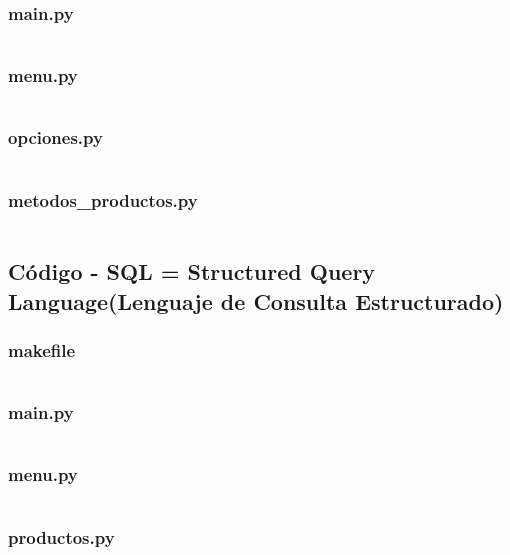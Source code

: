 \documentclass[12pt]{article}
\begin{document}
\subsubsection{main.py}
\inputminted[fontsize=\small, breaklines=true]{python}{CodigoCSV/main.py}

\subsubsection{menu.py}
\inputminted[fontsize=\small, breaklines=true]{python}{CodigoCSV/menu.py}

\subsubsection{opciones.py}
\inputminted[fontsize=\small, breaklines=true]{python}{CodigoCSV/opciones.py}

\subsubsection{metodos\_productos.py}
\inputminted[fontsize=\small, breaklines=true]{python}{CodigoCSV/metodos_productos.py}
\subsection{Código - SQL = Structured Query Language(Lenguaje de Consulta Estructurado)}

\subsubsection{makefile}
\inputminted[fontsize=\small]{make}{CodigoSQL/makefile}

\subsubsection{main.py}
\inputminted[fontsize=\small, breaklines=true]{python}{CodigoSQL/main.py}

\subsubsection{menu.py}
\inputminted[fontsize=\small, breaklines=true]{python}{CodigoSQL/menu.py}

\subsubsection{productos.py}
\inputminted[fontsize=\small, breaklines=true]{python}{CodigoSQL/productos.py}
\end{document}
